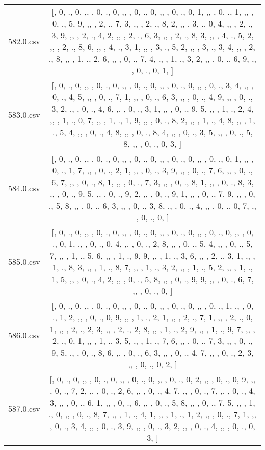 \begin{table}[ht]
\begin{tabular}{@{}c c@{}}
	582.0.csv & [, 0, ., 0, ,,  , 0, ., 0, ,,  , 0, ., 0, ,,  , 0, ., 0, 1, ,,  , 0, ., 1, ,,  , 0, ., 5, 9, ,,  , 2, ., 7, 3, ,,  , 2, ., 8, 2, ,,  , 3, ., 0, 4, ,,  , 2, ., 3, 9, ,,  , 2, ., 4, 2, ,,  , 2, ., 6, 3, ,,  , 2, ., 8, 3, ,,  , 4, ., 5, 2, ,,  , 2, ., 8, 6, ,,  , 4, ., 3, 1, ,,  , 3, ., 5, 2, ,,  , 3, ., 3, 4, ,,  , 2, ., 8, ,,  , 1, ., 2, 6, ,,  , 0, ., 7, 4, ,,  , 1, ., 3, 2, ,,  , 0, ., 6, 9, ,,  , 0, ., 0, 1, ]\\ 
	583.0.csv & [, 0, ., 0, ,,  , 0, ., 0, ,,  , 0, ., 0, ,,  , 0, ., 0, ,,  , 0, ., 3, 4, ,,  , 0, ., 4, 5, ,,  , 0, ., 7, 1, ,,  , 0, ., 6, 3, ,,  , 0, ., 4, 9, ,,  , 0, ., 3, 2, ,,  , 0, ., 4, 6, ,,  , 0, ., 3, 1, ,,  , 0, ., 9, 5, ,,  , 1, ., 2, 4, ,,  , 1, ., 0, 7, ,,  , 1, ., 1, 9, ,,  , 0, ., 8, 2, ,,  , 1, ., 4, 8, ,,  , 1, ., 5, 4, ,,  , 0, ., 4, 8, ,,  , 0, ., 8, 4, ,,  , 0, ., 3, 5, ,,  , 0, ., 5, 8, ,,  , 0, ., 0, 3, ]\\ 
	584.0.csv & [, 0, ., 0, ,,  , 0, ., 0, ,,  , 0, ., 0, ,,  , 0, ., 0, ,,  , 0, ., 0, 1, ,,  , 0, ., 1, 7, ,,  , 0, ., 2, 1, ,,  , 0, ., 3, 9, ,,  , 0, ., 7, 6, ,,  , 0, ., 6, 7, ,,  , 0, ., 8, 1, ,,  , 0, ., 7, 3, ,,  , 0, ., 8, 1, ,,  , 0, ., 8, 3, ,,  , 0, ., 9, 5, ,,  , 0, ., 9, 2, ,,  , 0, ., 9, 1, ,,  , 0, ., 7, 9, ,,  , 0, ., 5, 8, ,,  , 0, ., 6, 3, ,,  , 0, ., 3, 8, ,,  , 0, ., 4, ,,  , 0, ., 0, 7, ,,  , 0, ., 0, ]\\ 
	585.0.csv & [, 0, ., 0, ,,  , 0, ., 0, ,,  , 0, ., 0, ,,  , 0, ., 0, ,,  , 0, ., 0, ,,  , 0, ., 0, 1, ,,  , 0, ., 0, 4, ,,  , 0, ., 2, 8, ,,  , 0, ., 5, 4, ,,  , 0, ., 5, 7, ,,  , 1, ., 5, 6, ,,  , 1, ., 9, 9, ,,  , 1, ., 3, 6, ,,  , 2, ., 3, 1, ,,  , 1, ., 8, 3, ,,  , 1, ., 8, 7, ,,  , 1, ., 3, 2, ,,  , 1, ., 5, 2, ,,  , 1, ., 1, 5, ,,  , 0, ., 4, 2, ,,  , 0, ., 5, 8, ,,  , 0, ., 9, 9, ,,  , 0, ., 6, 7, ,,  , 0, ., 0, ]\\ 
	586.0.csv & [, 0, ., 0, ,,  , 0, ., 0, ,,  , 0, ., 0, ,,  , 0, ., 0, ,,  , 0, ., 1, ,,  , 0, ., 1, 2, ,,  , 0, ., 0, 9, ,,  , 1, ., 2, 1, ,,  , 2, ., 7, 1, ,,  , 2, ., 0, 1, ,,  , 2, ., 2, 3, ,,  , 2, ., 2, 8, ,,  , 1, ., 2, 9, ,,  , 1, ., 9, 7, ,,  , 2, ., 0, 1, ,,  , 1, ., 3, 5, ,,  , 1, ., 7, 6, ,,  , 0, ., 7, 3, ,,  , 0, ., 9, 5, ,,  , 0, ., 8, 6, ,,  , 0, ., 6, 3, ,,  , 0, ., 4, 7, ,,  , 0, ., 2, 3, ,,  , 0, ., 0, 2, ]\\ 
	587.0.csv & [, 0, ., 0, ,,  , 0, ., 0, ,,  , 0, ., 0, ,,  , 0, ., 0, 2, ,,  , 0, ., 0, 9, ,,  , 0, ., 7, 2, ,,  , 0, ., 2, 6, ,,  , 0, ., 4, 7, ,,  , 0, ., 7, ,,  , 0, ., 4, 3, ,,  , 0, ., 6, 1, ,,  , 0, ., 6, ,,  , 0, ., 5, 8, ,,  , 0, ., 7, 5, ,,  , 1, ., 0, ,,  , 0, ., 8, 7, ,,  , 1, ., 4, 1, ,,  , 1, ., 1, 2, ,,  , 0, ., 7, 1, ,,  , 0, ., 3, 4, ,,  , 0, ., 3, 9, ,,  , 0, ., 3, 2, ,,  , 0, ., 4, ,,  , 0, ., 0, 3, ]\\ 

\end{tabular}
\end{table}
